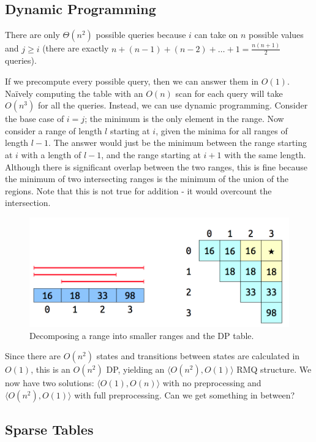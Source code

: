\documentclass[11pt, oneside]{article}
\begin{document}
\subsection{Dynamic Programming}

There are only \( \Theta(n^2) \) possible queries because \( i \) can take on \( n \) possible values
and \( j \geq i \) (there are exactly \( n + (n - 1) + (n - 2) + \ldots + 1 = \frac{n(n + 1)}{2} \) queries).

If we precompute every possible query, then we can answer them in \( O(1) \). Naïvely computing the table
with an \( O(n) \) scan for each query will take \( O(n^3) \) for all the queries.
Instead, we can use dynamic programming. Consider the base case of \( i = j \);
the minimum is the only element in the range. Now consider a range of length \( l \) starting
at \( i \), given the minima for all ranges of length \( l - 1 \).
The answer would just be the minimum between the range starting at \( i \) with a length of \( l - 1 \),
and the range starting at \( i + 1 \) with the same length. Although there is significant overlap between
the two ranges, this is fine because the minimum of two intersecting ranges is the minimum of the union
of the regions. Note that this is not true for addition - it would overcount the intersection.

\begin{figure}[h!]
\centering
\includegraphics[scale=0.25]{dp}
\caption{Decomposing a range into smaller ranges and the DP table.}
\end{figure}

Since there are \( O(n^2) \) states and transitions between states are calculated in \( O(1) \),
this is an \( O(n^2) \) DP, yielding an \( \langle O(n^2), O(1) \rangle \) RMQ structure. We now have two solutions:
\( \langle O(1), O(n) \rangle \) with no preprocessing and \( \langle O(n^2), O(1) \rangle \) with full preprocessing. Can we get something in between?

\subsection{Sparse Tables}
\end{document}
